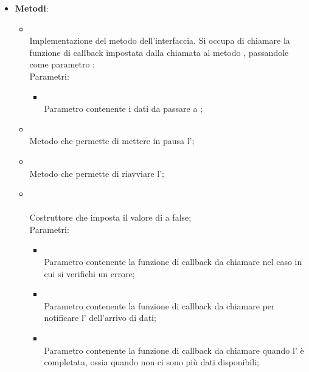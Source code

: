 \begin{itemize}
\begin{itemize}
	\end{itemize}
	\item \textbf{Metodi}:
	\begin{itemize}
		\item[]  \\		Implementazione del metodo dell'interfaccia. Si occupa di chiamare la funzione di callback impostata dalla chiamata al metodo , passandole come parametro ;\\
		Parametri:
		\begin{itemize}
			\item {} \\
			Parametro contenente i dati da passare a ;
		\end{itemize}
		\item[]  \\		Metodo che permette di mettere in pausa l';\\
		\item[]  \\		Metodo che permette di riavviare l';\\
		\item[] \\ \\		Costruttore che imposta il valore di  a false;\\
		Parametri:
		\begin{itemize}
			\item {} \\
			Parametro contenente la funzione di callback da chiamare nel caso in cui si verifichi un errore;
			\item {} \\
			Parametro contenente la funzione di callback da chiamare per notificare l' dell'arrivo di dati;
			\item {} \\
			Parametro contenente la funzione di callback da chiamare quando l' è completata, ossia quando non ci sono più dati disponibili;
		\end{itemize}

\end{itemize}
\end{itemize}
